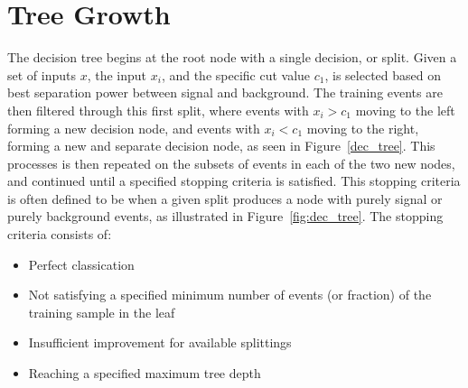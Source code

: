 \section{Tree Growth}
The decision tree begins at the root node with a single decision, or split. Given a set of inputs {$x$}, the input $x_{i}$, and the specific cut value $c_{1}$,
is selected based on best separation power between signal and background. The training events are then filtered through this first split, where events
with $x_{i} > c_{1}$ moving to the left forming a new decision node, and events with $x_{i} < c_{1}$ moving to the right, forming a new and separate 
decision node, as seen in Figure~\ref{dec_tree}. This processes is then repeated on the subsets of events in each of the two new nodes, and continued until
a specified stopping criteria is satisfied. This stopping criteria is often defined to be when a given split produces a node with purely signal or purely
background events, as illustrated in Figure~\ref{fig:dec_tree}. The stopping criteria consists of:
\begin{itemize}
\item Perfect classication
\item Not satisfying a specified minimum number of events (or fraction) of the training sample in the leaf
\item Insufficient improvement for available splittings
\item Reaching a specified maximum tree depth
\end{itemize}

